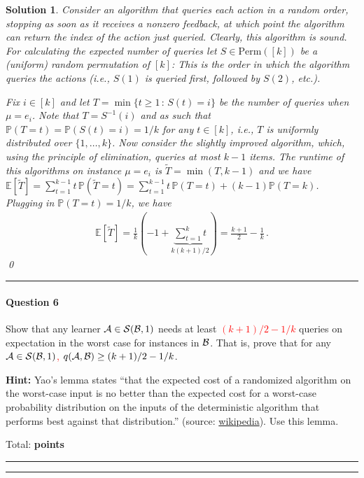 \documentclass{article}
\DeclareMathOperator*{\1}{\mathbbm{1}}
\newcommand{\E}{\mathbb E}
\newcommand{\Prob}[1]{\mathbb{P}( #1 )}
\newcounter{DocPoints} %
\newcounter{QuestionPoints} %
\newcommand{\tpoints}[1]{        %
	\ifthenelse{\isempty{#1}}%
	{%
	}%
	{%
		\addtocounter{DocPoints}{#1}
		\addtocounter{QuestionPoints}{#1}
	}													 %
	\par\mbox{}\par\noindent\hfill {Total: \bf \arabic{QuestionPoints}\xspace points}\par\mbox{}\par\hrule\hrule
	\setcounter{QuestionPoints}{0}
}
\newtheorem*{solution*}{Solution}
\begin{document}
\begin{solution*}
Consider an algorithm that queries each action in a random order, stopping as soon as it receives a nonzero feedback, at which point the algorithm can return the index of the action just queried.
Clearly, this algorithm is sound. 
For calculating the expected number of queries let
$S\in \mathrm{Perm}([k])$ be a (uniform) random permutation of $[k]$: This is the order in which the algorithm queries the actions (i.e., $S(1)$ is queried first, followed by $S(2)$, etc.).

Fix $i\in [k]$ and let $T = \min\{ t\ge 1\,:\, S(t) = i \}$ be the number of queries when $\mu=e_i$. 
Note that $T=S^{-1}(i)$ and as such that $\Prob{T=t}=\Prob{S(t)=i}=1/k$ for any $t\in [k]$, i.e., $T$ is uniformly distributed over $\{1,\dots,k\}$.
Now consider the slightly improved algorithm, 
which, using the principle of elimination, queries at most $k-1$
items. The runtime of this algorithms on instance $\mu=e_i$ is $\tilde T = \min(T,k-1)$ and we have
$\E[\tilde T] = \sum_{t=1}^{k-1} t\, \Prob{ \tilde T = t } = \sum_{t=1}^{k-1} t \,\Prob{T=t} + (k-1) \Prob{T=k}$. Plugging in $\Prob{T=t}=1/k$, we have
\begin{align}
\E[\tilde T] = \frac{1}{k} \left(-1+ \underbrace{\sum_{t=1}^{k} t}_{k(k+1)/2} \right) 
=  \frac{k+1}{2}-\frac{1}{k}\,. 
\label{eq:calc}
\end{align}
\qed\par\bigskip\par\hrule
\end{solution*}

\paragraph{Question 6} 
Show that any learner $\mathcal{A}\in \mathcal{S}(\mathcal{B},1)$ needs at least \textcolor{red}{$(k+1)/2-1/k$} queries 
on expectation in the worst case for instances in $\mathcal{B}$.
That is, prove that for any \textcolor{red}{$\mathcal{A}\in \mathcal{S}(\mathcal{B},1)$, 
$q(\mathcal{A},\mathcal{B})\ge (k+1)/2 -1/k$}. 
\medskip

\noindent \textbf{Hint:}
Yao's lemma states
``that the expected cost of a randomized algorithm on the worst-case input is no better than the expected cost for a worst-case probability distribution on the inputs of the deterministic algorithm that performs best against that distribution.'' (source: \href{shorturl.at/cjrU7}{wikipedia}).
Use this lemma.

\tpoints{15}
\end{document}

